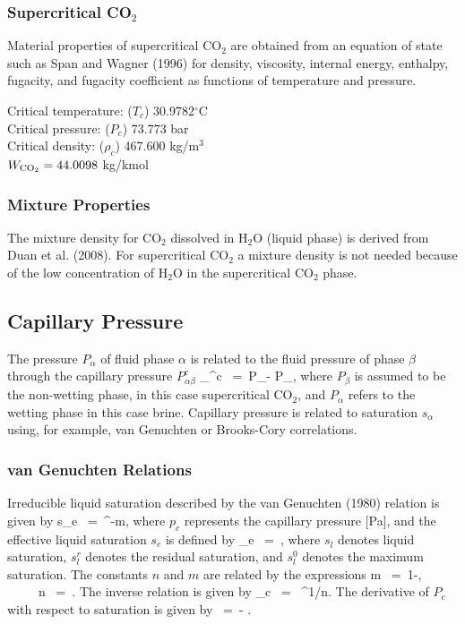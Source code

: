 \documentclass[12pt]{article}
\def\EQ#1\EN{\begin{equation}#1\end{equation}}
\newcommand{\eq}{\ =\ }
\newcommand{\degc}{$^\circ$C}
\renewcommand{\c}{{\rm CO_2}}
\renewcommand{\a}{{\alpha}}
\renewcommand{\b}{{\beta}}
\begin{document}
\subsubsection{Supercritical CO$_2$}

Material properties of supercritical CO$_2$ are obtained from an equation of state such as Span and Wagner (1996) for density, viscosity, internal energy, enthalpy, fugacity, and fugacity coefficient as functions of temperature and pressure.

\noindent
Critical temperature: ($T_c$) 30.9782\degc\\
Critical pressure: ($P_c$)	73.773 bar\\
Critical density: ($\rho_c$) 467.600 kg/m$^3$\\
$W_{\c} = 44.0098$ kg/kmol

\subsubsection{Mixture Properties}

The mixture density for CO$_2$ dissolved in H$_2$O (liquid phase) is derived from Duan et al. (2008). For supercritical CO$_2$ a mixture density is not needed because of the low concentration of H$_2$O in the supercritical CO$_2$ phase.

\subsection{Capillary Pressure}

The pressure $P_\a$ of fluid phase $\a$ is related to the fluid pressure of phase $\b$ through the capillary pressure $P_{\a\b}^c$
\EQ
P_{\a\b}^c \eq P_\b - P_\a,
\EN
where $P_\b$ is assumed to be the non-wetting phase, in this case supercritical CO$_2$, and $P_\a$ refers to the wetting phase in this case brine. Capillary pressure is related to saturation $s_\a$ using, for example, van Genuchten or Brooks-Cory correlations.

\subsubsection{van Genuchten Relations}

Irreducible liquid saturation described by the van Genuchten (1980) relation is given by
\EQ\label{seff}
s_e \eq {}^{-m}, 
\EN 
where $p_c$ represents the capillary pressure [Pa], and the effective liquid saturation $s_e$ is defined by 
\EQ 
s_e \eq {}, 
\EN 
where $s_l^{}$ denotes liquid saturation, $s_l^r$ denotes the residual saturation, and $s_l^0$ denotes the maximum saturation. The constants $n$ and $m$ are related by the expressions 
\EQ\label{lambda} 
m \eq 1-, \ \ \ \ \ n \eq {}. 
\EN 
The inverse relation is given by
\EQ
P_c \eq {} ^{1/n}.
\EN
The derivative of $P_c$ with respect to saturation is given by
\EQ
\frac{dP_c}{ds_e} \eq - .
\EN
\end{document}
